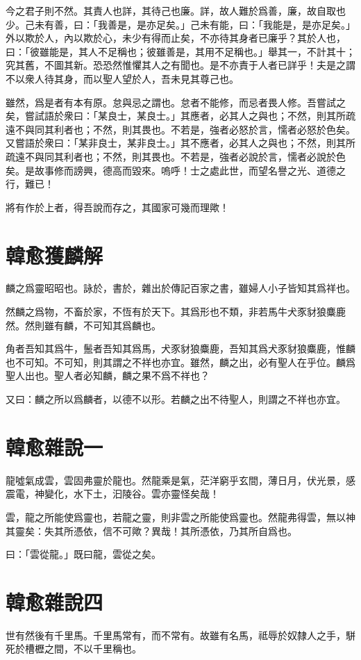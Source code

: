 今之君子則不然。其責人也詳，其待己也廉。詳，故人難於爲善，廉，故自取也少。己未有善，曰：「我善是，是亦足矣。」己未有能，曰：「我能是，是亦足矣。」外以欺於人，內以欺於心，未少有得而止矣，不亦待其身者已廉乎？其於人也，曰：「彼雖能是，其人不足稱也；彼雖善是，其用不足稱也。」舉其一，不計其十；究其舊，不圖其新。恐恐然惟懼其人之有聞也。是不亦責于人者已詳乎！夫是之謂不以衆人待其身，而以聖人望於人，吾未見其尊己也。

雖然，爲是者有本有原。怠與忌之謂也。怠者不能修，而忌者畏人修。吾嘗試之矣，嘗試語於衆曰：「某良士，某良士。」其應者，必其人之與也；不然，則其所疏遠不與同其利者也；不然，則其畏也。不若是，強者必怒於言，懦者必怒於色矣。又嘗語於衆曰：「某非良士，某非良士。」其不應者，必其人之與也；不然，則其所疏遠不與同其利者也；不然，則其畏也。不若是，強者必說於言，懦者必說於色矣。是故事修而謗興，德高而毀來。嗚呼！士之處此世，而望名譽之光、道德之行，難已！

將有作於上者，得吾說而存之，其國家可幾而理歟！

\section[獲麟解\quad{\small 韓愈}]{{\normalsize 韓愈}\quad 獲麟解}
麟之爲靈昭昭也。詠於，書於，雜出於傳記百家之書，雖婦人小子皆知其爲祥也。

然麟之爲物，不畜於家，不恆有於天下。其爲形也不類，非若馬牛犬豕豺狼麋鹿然。然則雖有麟，不可知其爲麟也。

角者吾知其爲牛，鬛者吾知其爲馬，犬豕豺狼麋鹿，吾知其爲犬豕豺狼麋鹿，惟麟也不可知。不可知，則其謂之不祥也亦宜。雖然，麟之出，必有聖人在乎位。麟爲聖人出也。聖人者必知麟，麟之果不爲不祥也？

又曰：麟之所以爲麟者，以德不以形。若麟之出不待聖人，則謂之不祥也亦宜。

\section[雜說一\quad{\small 韓愈}]{{\normalsize 韓愈}\quad 雜說一}
龍噓氣成雲，雲固弗靈於龍也。然龍乘是氣，茫洋窮乎玄間，薄日月，伏光景，感震電，神變化，水下土，汩陵谷。雲亦靈怪矣哉！

雲，龍之所能使爲靈也，若龍之靈，則非雲之所能使爲靈也。然龍弗得雲，無以神其靈矣：失其所憑依，信不可歟？異哉！其所憑依，乃其所自爲也。

曰：「雲從龍。」既曰龍，雲從之矣。

\section[雜說四\quad{\small 韓愈}]{{\normalsize 韓愈}\quad 雜說四}
世有然後有千里馬。千里馬常有，而不常有。故雖有名馬，祗辱於奴隸人之手，駢死於槽櫪之間，不以千里稱也。

